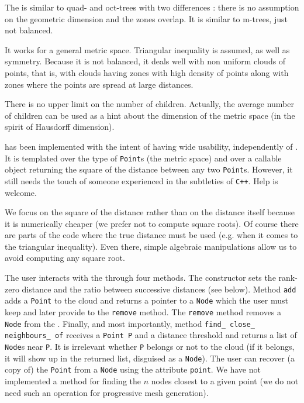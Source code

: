 The {\small\tt{}} is similar to quad- and oct-trees with two differences :
there is no assumption on the geometric dimension and the zones overlap.
It is similar to m-trees, just not balanced.

It works for a general metric space.
Triangular inequality is assumed, as well as symmetry.
Because it is not balanced, it deals well with non uniform clouds of points, that is,
with clouds having zones with
high density of points along with zones where the points are spread at large distances.

There is no upper limit on the number of children.
Actually, the average number of children can be used as a hint about the dimension of the
metric space (in the spirit of Hausdorff dimension).

{\small\tt {}} has been implemented with the intent of having wide usability,
independently of \maniFEM.
It is templated over the type of {\small\tt Point}s (the metric space) and over a callable
object returning the square of the distance between any two {\small\tt Point}s.
However, it still needs the touch of someone experienced in the subtleties of {\tt C++}.
Help is welcome.

We focus on the square of the distance rather than on the distance itself because it
is numerically cheaper (we prefer not to compute square roots).
Of course there are parts of the code where the true distance must be used
(e.g. when it comes to the triangular inequality).
Even there, simple algebraic manipulations allow us to avoid computing any square root.

The user interacts with the {\small\tt{}} through four methods.
The constructor sets the rank-zero distance and the ratio between successive
distances (see below).
Method {\small\tt add} adds a {\small\tt Point} to the cloud and returns a pointer to a
{\small\tt Node} which the user must keep and later provide to the {\small\tt remove} method.
The {\small\tt remove} method removes a {\small\tt Node} from the {\small\tt{}}.
Finally, and most importantly, method {\small\tt find\_\,close\_\,neighbours\_\,of} receives a
{\small\tt Point P} and a distance threshold and returns a list of {\small\tt Node}s near
{\small\tt P}.
It is irrelevant whether {\small\tt P} belongs or not to the cloud (if it belongs, it will
show up in the returned list, disguised as a {\small\tt Node}).
The user can recover (a copy of) the {\small\tt Point} from a {\small\tt Node} using the attribute
{\small\tt point}.
We have not implemented a method for finding the $n$ nodes closest to a given point
(we do not need such an operation for progressive mesh generation).

